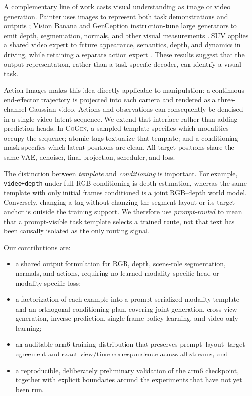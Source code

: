 \documentclass{article}
\newcommand{\method}{\textsc{CoGen}}
\newcommand{\code}[1]{\texttt{#1}}
\begin{document}
A complementary line of work casts visual understanding as image or video generation. Painter
uses images to represent both task demonstrations and outputs \citep{wang2023painter}; Vision
Banana and GenCeption instruction-tune large generators to emit depth, segmentation, normals,
and other visual measurements \citep{gabeur2026image,wang2026video}. SUV applies a shared video
expert to future appearance, semantics, depth, and dynamics in driving, while retaining a
separate action expert \citep{yuan2026suv}. These results suggest that the output representation,
rather than a task-specific decoder, can identify a visual task.

Action Images \citep{zhen2026action} makes this idea directly applicable to manipulation: a
continuous end-effector trajectory is projected into each camera and rendered as a three-channel
Gaussian video. Actions and observations can consequently be denoised in a single video latent
sequence. We extend that interface rather than adding prediction heads. In \method, a sampled
template specifies which modalities occupy the sequence; atomic tags textualize that template;
and a conditioning mask specifies which latent positions are clean. All target positions share
the same VAE, denoiser, final projection, scheduler, and loss.

The distinction between \emph{template} and \emph{conditioning} is important. For example,
\code{video+depth} under full RGB conditioning is depth estimation, whereas the same template
with only initial frames conditioned is a joint RGB--depth world model. Conversely, changing a
tag without changing the segment layout or its target anchor is outside the training support.
We therefore use \emph{prompt-routed} to mean that a prompt-visible task template selects a
trained route, not that text has been causally isolated as the only routing signal.

Our contributions are:
\begin{itemize}
  \item a shared output formulation for RGB, depth, scene-role segmentation, normals, and
  actions, requiring no learned modality-specific head or modality-specific loss;
  \item a factorization of each example into a prompt-serialized modality template and an
  orthogonal conditioning plan, covering joint generation, cross-view generation, inverse
  prediction, single-frame policy learning, and video-only learning;
  \item an auditable arm6 training distribution that preserves prompt--layout--target agreement
  and exact view/time correspondence across all streams; and
  \item a reproducible, deliberately preliminary validation of the arm6 checkpoint, together
  with explicit boundaries around the experiments that have not yet been run.
\end{itemize}
\end{document}
